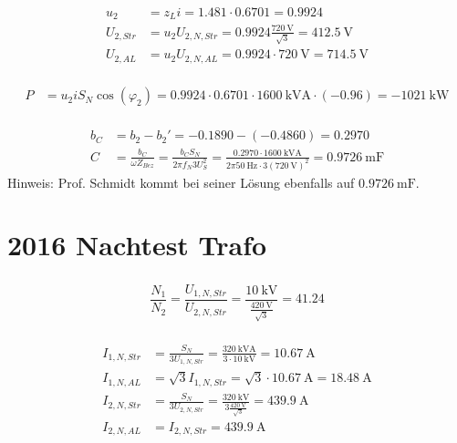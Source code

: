 \documentclass[11pt,a4paper]{scrartcl}
\newcommand{\mybr}[1]{\left(#1\right)}
\newcommand{\0}{_{\mybr{0}}}
\newcommand{\1}{_{\mybr{1}}}
\newcommand{\2}{_{\mybr{2}}}
\newcommand{\USS}{U_{2,Str}}
\newcommand{\USA}{U_{2,AL}}
\newcommand{\UPNS}{U_{1,N,Str}}
\newcommand{\USNS}{U_{2,N,Str}}
\newcommand{\USNA}{U_{2,N,AL}}
\newcommand{\IPNS}{I_{1,N,Str}}
\newcommand{\ISNS}{I_{2,N,Str}}
\newcommand{\IPNA}{I_{1,N,AL}}
\newcommand{\ISNA}{I_{2,N,AL}}
\newcommand{\cz}{\cos\mybr{\varphi_2}}
\begin{document}
\subsection{}
\begin{align}
u_2&=z_L i=\num{1.481}\cdot\num{0.6701}=\num{0.9924}\\
\USS&=u_2\USNS=\num{0.9924}\frac{\SI{720}{\volt}}{\sqrt{3}}=\SI{412.5}{\volt}\\
\USA&=u_2\USNA=\num{0.9924}\cdot\SI{720}{\volt}=\SI{714.5}{\volt}
\end{align}

\subsection{}
\begin{align}
P&=u_2 i S_N \cz=\num{0.9924}\cdot\num{0.6701}\cdot\SI{1600}{\kilo\volt\ampere}\cdot\mybr{\num{-0.96}}=\SI{-1021}{\kilo\watt}
\end{align}

\subsection{}
\begin{align}
b_C&=b_2-b_2'=\num{-0.1890}-\mybr{\num{-0.4860}}=\num{0.2970}\\
C&=\frac{b_C}{\omega Z_{Bez}}=\frac{b_C S_N}{2\pi f_N 3 U_S^2}=\frac{0.2970\cdot\SI{1600}{\kilo\volt\ampere}}{2\pi\SI{50}{\hertz}\cdot 3\mybr{\SI{720}{\volt}}^2}=\SI{0.9726}{\milli\farad}
\end{align}
Hinweis: Prof. Schmidt kommt bei seiner Lösung ebenfalls auf $\SI{0.9726}{\milli\farad}$.


\clearpage
\part{2016 Nachtest Trafo}
\section{}
\begin{equation}
\frac{N_1}{N_2}=\frac{\UPNS}{\USNS}=\frac{\SI{10}{\kilo\volt}}{\frac{\SI{420}{\volt}}{\sqrt{3}}}=\num{41.24}
\end{equation}

\section{}
\begin{align}
\IPNS&=\frac{S_N}{3\UPNS}=\frac{\SI{320}{\kilo\volt\ampere}}{3\cdot\SI{10}{\kilo\volt}}=\SI{10.67}{\ampere}\\
\IPNA&=\sqrt{3}\IPNS=\sqrt{3}\cdot\SI{10.67}{\ampere}=\SI{18.48}{\ampere}\\
\ISNS&=\frac{S_N}{3\USNS}=\frac{\SI{320}{\kilo\volt}}{3\frac{\SI{420}{\volt}}{\sqrt{3}}}=\SI{439.9}{\ampere}\\
\ISNA&=\ISNS=\SI{439.9}{\ampere}
\end{align}
\end{document}
